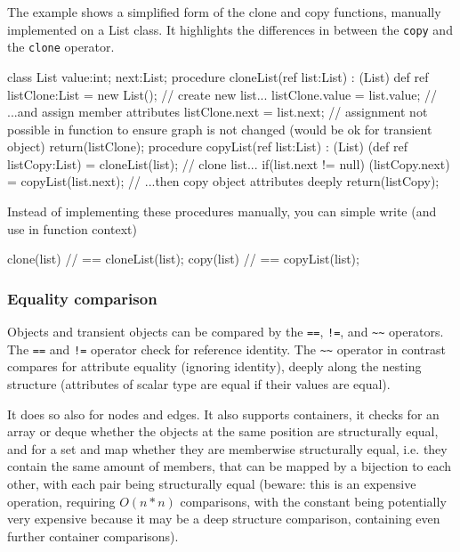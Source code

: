 \begin{example}
The example shows a simplified form of the clone and copy functions, manually implemented on a List class.
It highlights the differences in between the \texttt{copy} and the \texttt{clone} operator.
\begin{grgen}
class List {
  value:int;
  next:List;
}
procedure cloneList(ref list:List) : (List)
{
  def ref listClone:List = new List(); // create new list...
  listClone.value = list.value; // ...and assign member attributes
  listClone.next = list.next; // assignment not possible in function to ensure graph is not changed (would be ok for transient object)
  return(listClone);
}
procedure copyList(ref list:List) : (List)
{
  (def ref listCopy:List) = cloneList(list); // clone list...
  if(list.next != null) {
    (listCopy.next) = copyList(list.next); // ...then copy object attributes deeply
  } 
  return(listCopy);
}
\end{grgen}
Instead of implementing these procedures manually, you can simple write (and use in function context)
\begin{grgen}
clone(list) // == cloneList(list);
copy(list) // == copyList(list);
\end{grgen}
\end{example}


\subsubsection{Equality comparison}\label{subsec:objectequality}

Objects and transient objects can be compared by the \texttt{==}, \texttt{!=}, and \texttt{\textasciitilde\textasciitilde} operators.
The \texttt{==} and \texttt{!=} operator check for reference identity.
The \texttt{\textasciitilde\textasciitilde} operator in contrast compares for attribute equality (ignoring identity), deeply along the nesting structure (attributes of scalar type are equal if their values are equal).

It does so also for nodes and edges.
It also supports containers, it checks for an array or deque whether the objects at the same position are structurally equal, and for a set and map whether they are memberwise structurally equal, i.e. they contain the same amount of members, that can be mapped by a bijection to each other, with each pair being structurally equal
(beware: this is an expensive operation, requiring $O(n*n)$ comparisons, with the constant being potentially very expensive because it may be a deep structure comparison, containing even further container comparisons).

